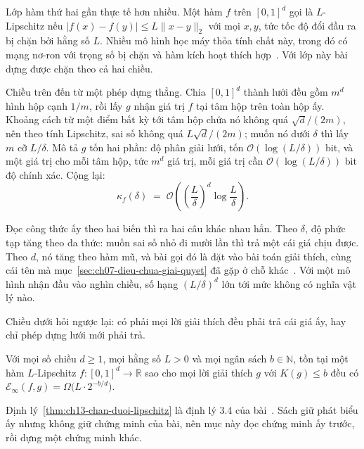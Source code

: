 %
Lớp hàm thứ hai gần thực tế hơn nhiều. Một hàm $f$ trên $[0,1]^d$ gọi là
$L$-Lipschitz nếu $|f(x) - f(y)| \le L\|x-y\|_2$ với mọi $x, y$, tức tốc độ đổi
đầu ra bị chặn bởi hằng số $L$. Nhiều mô hình học máy thỏa tính chất này, trong
đó có mạng nơ-ron với trọng số bị chặn và hàm kích hoạt thích
hợp~\autocite{p26limits}. Với lớp này bài dựng được chặn theo cả hai chiều.

Chiều trên đến từ một phép dựng thẳng. Chia $[0,1]^d$ thành lưới đều gồm $m^d$
hình hộp cạnh $1/m$, rồi lấy $g$ nhận giá trị $f$ tại tâm hộp trên toàn hộp ấy.
Khoảng cách từ một điểm bất kỳ tới tâm hộp chứa nó không quá $\sqrt{d}/(2m)$,
nên theo tính Lipschitz, sai số không quá $L\sqrt{d}/(2m)$; muốn nó dưới $\delta$
thì lấy $m$ cỡ $L/\delta$. Mô tả $g$ tốn hai phần: độ phân giải lưới, tốn
$\mathcal{O}(\log(L/\delta))$ bit, và một giá trị cho mỗi tâm hộp, tức $m^d$ giá
trị, mỗi giá trị cần $\mathcal{O}(\log(L/\delta))$ bit độ chính xác. Cộng lại:
\[
  \kappa_f(\delta) \;=\; \mathcal{O}\!\left( \left(\frac{L}{\delta}\right)^{\!d} \log \frac{L}{\delta} \right).
\]

%
Đọc công thức ấy theo hai biến thì ra hai câu khác nhau hẳn. Theo $\delta$, độ
phức tạp tăng theo đa thức: muốn sai số nhỏ đi mười lần thì trả một cái giá chịu
được. Theo $d$, nó tăng theo hàm mũ, và bài gọi đó là  đặt vào bài toán giải thích, cùng cái tên mà
mục~\ref{sec:ch07-dieu-chua-giai-quyet} đã gặp ở chỗ khác~\autocite{p26limits}.
Với một mô hình nhận đầu vào nghìn chiều, số hạng $(L/\delta)^d$ lớn tới mức
không có nghĩa vật lý nào.

Chiều dưới hỏi ngược lại: có phải mọi lời giải thích đều phải trả cái giá ấy,
hay chỉ phép dựng lưới mới phải trả.

\begin{theorem}
\label{thm:ch13-chan-duoi-lipschitz}
Với mọi số chiều $d \ge 1$, mọi hằng số $L > 0$ và mọi ngân sách
$b \in \mathbb{N}$, tồn tại một hàm $L$-Lipschitz $f : [0,1]^d \to \mathbb{R}$
sao cho mọi lời giải thích $g$ với $K(g) \le b$ đều có
$\mathcal{E}_{\infty}(f,g) = \Omega\big(L \cdot 2^{-b/d}\big)$.
\end{theorem}

Định lý~\ref{thm:ch13-chan-duoi-lipschitz} là định lý 3.4 của
bài~\autocite{p26limits}. Sách giữ phát biểu ấy nhưng không giữ chứng minh của
bài, nên mục này đọc chứng minh ấy trước, rồi dựng một chứng minh khác.

